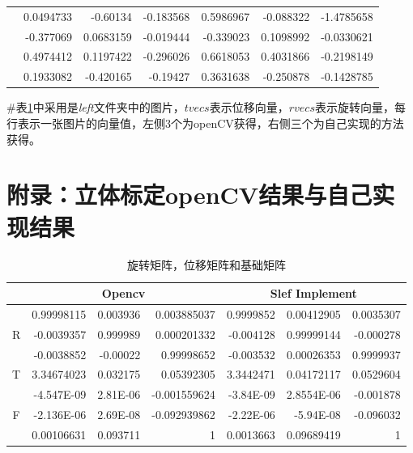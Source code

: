\documentclass[UTF8]{ctexart}
\begin{document}
\begin{appendices}
\begin{table}[htbp]
\begin{tabular}{|c|r|r|r|r|r|r|}
\cmidrule{2-7}          & 0.0494733 & -0.60134 & -0.183568 & 0.5986967 & -0.088322 & -1.4785658 \\
\cmidrule{2-7}          & -0.377069 & 0.0683159 & -0.019444 & -0.339023 & 0.1098992 & -0.0330621 \\
\cmidrule{2-7}          & 0.4974412 & 0.1197422 & -0.296026 & 0.6618053 & 0.4031866 & -0.2198149 \\
\cmidrule{2-7}          & 0.1933082 & -0.420165 & -0.19427 & 0.3631638 & -0.250878 & -0.1428785 \\
    \bottomrule[2pt]
    \end{tabular}%
  \label{tab:camAndRt}%
\end{table}%
\#表\ref{tab:camAndRt}中采用是\textit{left}文件夹中的图片，$tvecs$表示位移向量，$rvecs$表示旋转向量，每行表示一张图片的向量值，左侧3个为openCV获得，右侧三个为自己实现的方法获得。
\section{附录：立体标定openCV结果与自己实现结果}\label{appendices:B}
\begin{table}[htbp]
  \centering
  \caption{旋转矩阵，位移矩阵和基础矩阵}
    \begin{tabular}{|c|r|r|r|r|r|r|}
    \toprule
          & \multicolumn{3}{c|}{Opencv} & \multicolumn{3}{c|}{Slef Implement} \\
    \midrule
    \multirow{3}[6]{*}{R} & 0.99998115 & 0.003936 & 0.003885037 & 0.9999852 & 0.00412905 & 0.0035307 \\
\cmidrule{2-7}          & -0.0039357 & 0.999989 & 0.000201332 & -0.004128 & 0.99999144 & -0.000278 \\
\cmidrule{2-7}          & -0.0038852 & -0.00022 & 0.99998652 & -0.003532 & 0.00026353 & 0.9999937 \\
    \midrule
    T     & 3.34674023 & 0.032175 & 0.05392305 & 3.3442471 & 0.04172117 & 0.0529604 \\
    \midrule
    \multirow{3}[6]{*}{F} & -4.547E-09 & 2.81E-06 & -0.001559624 & -3.84E-09 & 2.8554E-06 & -0.001878 \\
\cmidrule{2-7}          & -2.136E-06 & 2.69E-08 & -0.092939862 & -2.22E-06 & -5.94E-08 & -0.096032 \\
\cmidrule{2-7}          & 0.00106631 & 0.093711 & 1     & 0.0013663 & 0.09689419 & 1 \\
    \bottomrule
    \end{tabular}%
  \label{tab:addlabel}%
\end{table}%
\end{appendices}
\end{document}
